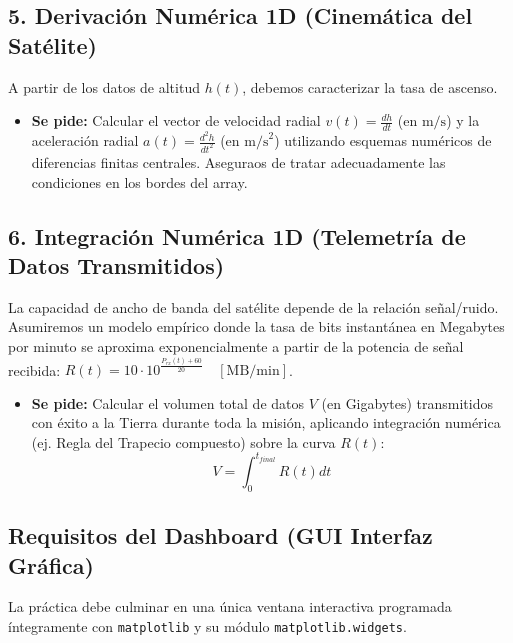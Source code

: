 	\subsection*{5. Derivación Numérica 1D (Cinemática del Satélite)}
	A partir de los datos de altitud $h(t)$, debemos caracterizar la tasa de ascenso.
	
	\begin{itemize}
		\item \textbf{Se pide:} Calcular el vector de velocidad radial $v(t) = \frac{dh}{dt}$ (en $\text{m/s}$) y la aceleración radial $a(t) = \frac{d^2h}{dt^2}$ (en $\text{m/s}^2$) utilizando esquemas numéricos de diferencias finitas centrales. Aseguraos de tratar adecuadamente las condiciones en los bordes del array.
	\end{itemize}
	
	\subsection*{6. Integración Numérica 1D (Telemetría de Datos Transmitidos)}
	La capacidad de ancho de banda del satélite depende de la relación señal/ruido. Asumiremos un modelo empírico donde la tasa de bits instantánea en Megabytes por minuto se aproxima exponencialmente a partir de la potencia de señal recibida: $R(t) = 10 \cdot 10^{\frac{P_{rx}(t) + 60}{20}} \quad [\text{MB/min}]$.
	
	\begin{itemize}
		\item \textbf{Se pide:} Calcular el volumen total de datos $V$ (en Gigabytes) transmitidos con éxito a la Tierra durante toda la misión, aplicando integración numérica (ej. Regla del Trapecio compuesto) sobre la curva $R(t)$:
		$$ V = \int_{0}^{t_{final}} R(t) dt $$
	\end{itemize}
	
	\subsection*{Requisitos del Dashboard (GUI Interfaz Gráfica)}
	La práctica debe culminar en una única ventana interactiva programada íntegramente con \texttt{matplotlib} y su módulo \texttt{matplotlib.widgets}.
	
